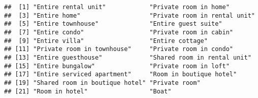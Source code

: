 \documentclass[
]{article}
\newenvironment{Shaded}{\begin{snugshade}}{\end{snugshade}}
\newcommand{\CommentTok}[1]{\textcolor[rgb]{0.56,0.35,0.01}{\textit{#1}}}
\newcommand{\FunctionTok}[1]{\textcolor[rgb]{0.00,0.00,0.00}{#1}}
\newcommand{\NormalTok}[1]{#1}
\newcommand{\OtherTok}[1]{\textcolor[rgb]{0.56,0.35,0.01}{#1}}
\newcommand{\SpecialCharTok}[1]{\textcolor[rgb]{0.00,0.00,0.00}{#1}}
\newcommand{\StringTok}[1]{\textcolor[rgb]{0.31,0.60,0.02}{#1}}
\begin{document}
\begin{Shaded}
\end{Shaded}

\begin{Shaded}
\end{Shaded}

\begin{verbatim}
##  [1] "Entire rental unit"            "Private room in home"         
##  [3] "Entire home"                   "Private room in rental unit"  
##  [5] "Entire townhouse"              "Entire guest suite"           
##  [7] "Entire condo"                  "Private room in cabin"        
##  [9] "Entire villa"                  "Entire cottage"               
## [11] "Private room in townhouse"     "Private room in condo"        
## [13] "Entire guesthouse"             "Shared room in rental unit"   
## [15] "Entire bungalow"               "Private room in loft"         
## [17] "Entire serviced apartment"     "Room in boutique hotel"       
## [19] "Shared room in boutique hotel" "Private room"                 
## [21] "Room in hotel"                 "Boat"
\end{verbatim}

\begin{Shaded}
\end{Shaded}
\end{document}
